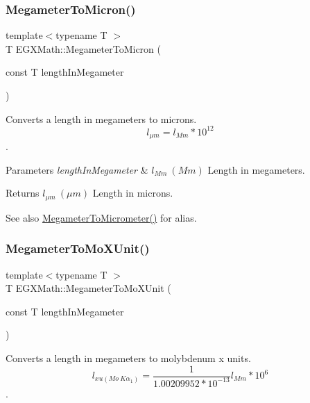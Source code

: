 \subsubsection{\texorpdfstring{Megameter\+To\+Micron()}{MegameterToMicron()}}
{\footnotesize\ttfamily template$<$typename T $>$ \\
T E\+G\+X\+Math\+::\+Megameter\+To\+Micron (\begin{DoxyParamCaption}\item[{const T}]{length\+In\+Megameter }\end{DoxyParamCaption})}



Converts a length in megameters to microns. \[ l_{\mu m}=l_{Mm} * 10^{12} \]. 


\begin{DoxyParams}{Parameters}
{\em length\+In\+Megameter} & $ l_{Mm}\ (Mm)$ Length in megameters. \\
\hline
\end{DoxyParams}
\begin{DoxyReturn}{Returns}
$ l_{\mu m}\ (\mu m)$ Length in microns. 
\end{DoxyReturn}
\begin{DoxySeeAlso}{See also}
\mbox{\hyperlink{group___e_g_x_math-_conversions-_length_conversions-_megameter-_s_i_ga4b0dc1e6dd503c23428038a69ff07146}{Megameter\+To\+Micrometer()}} for alias. 
\end{DoxySeeAlso}
\mbox{\label{group___e_g_x_math-_conversions-_length_conversions-_megameter-_non-_s_i_ga134a9fb2603b93c739c4ee58864f69c6}} 
\subsubsection{\texorpdfstring{Megameter\+To\+Mo\+X\+Unit()}{MegameterToMoXUnit()}}
{\footnotesize\ttfamily template$<$typename T $>$ \\
T E\+G\+X\+Math\+::\+Megameter\+To\+Mo\+X\+Unit (\begin{DoxyParamCaption}\item[{const T}]{length\+In\+Megameter }\end{DoxyParamCaption})}



Converts a length in megameters to molybdenum x units. \[ l_{xu(Mo\ K\alpha_1)}=\frac{1}{1.00209952*10^{-13}} l_{Mm} * 10^{6}\]. 


